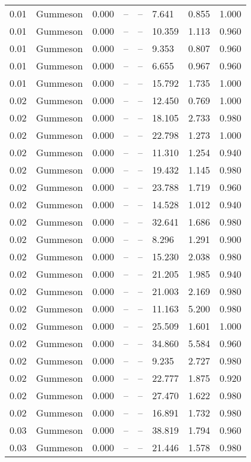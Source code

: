 \begin{table}[H]
\begin{tabular}{l c l l l}
0.01 & Gummeson & 0.000 & -- & -- & 7.641 & 0.855 & 1.000 \\
0.01 & Gummeson & 0.000 & -- & -- & 10.359 & 1.113 & 0.960 \\
0.01 & Gummeson & 0.000 & -- & -- & 9.353 & 0.807 & 0.960 \\
0.01 & Gummeson & 0.000 & -- & -- & 6.655 & 0.967 & 0.960 \\
0.01 & Gummeson & 0.000 & -- & -- & 15.792 & 1.735 & 1.000 \\
0.02 & Gummeson & 0.000 & -- & -- & 12.450 & 0.769 & 1.000 \\
0.02 & Gummeson & 0.000 & -- & -- & 18.105 & 2.733 & 0.980 \\
0.02 & Gummeson & 0.000 & -- & -- & 22.798 & 1.273 & 1.000 \\
0.02 & Gummeson & 0.000 & -- & -- & 11.310 & 1.254 & 0.940 \\
0.02 & Gummeson & 0.000 & -- & -- & 19.432 & 1.145 & 0.980 \\
0.02 & Gummeson & 0.000 & -- & -- & 23.788 & 1.719 & 0.960 \\
0.02 & Gummeson & 0.000 & -- & -- & 14.528 & 1.012 & 0.940 \\
0.02 & Gummeson & 0.000 & -- & -- & 32.641 & 1.686 & 0.980 \\
0.02 & Gummeson & 0.000 & -- & -- & 8.296 & 1.291 & 0.900 \\
0.02 & Gummeson & 0.000 & -- & -- & 15.230 & 2.038 & 0.980 \\
0.02 & Gummeson & 0.000 & -- & -- & 21.205 & 1.985 & 0.940 \\
0.02 & Gummeson & 0.000 & -- & -- & 21.003 & 2.169 & 0.980 \\
0.02 & Gummeson & 0.000 & -- & -- & 11.163 & 5.200 & 0.980 \\
0.02 & Gummeson & 0.000 & -- & -- & 25.509 & 1.601 & 1.000 \\
0.02 & Gummeson & 0.000 & -- & -- & 34.860 & 5.584 & 0.960 \\
0.02 & Gummeson & 0.000 & -- & -- & 9.235 & 2.727 & 0.980 \\
0.02 & Gummeson & 0.000 & -- & -- & 22.777 & 1.875 & 0.920 \\
0.02 & Gummeson & 0.000 & -- & -- & 27.470 & 1.622 & 0.980 \\
0.02 & Gummeson & 0.000 & -- & -- & 16.891 & 1.732 & 0.980 \\
0.03 & Gummeson & 0.000 & -- & -- & 38.819 & 1.794 & 0.960 \\
0.03 & Gummeson & 0.000 & -- & -- & 21.446 & 1.578 & 0.980 \\

\end{tabular}
\end{table}
